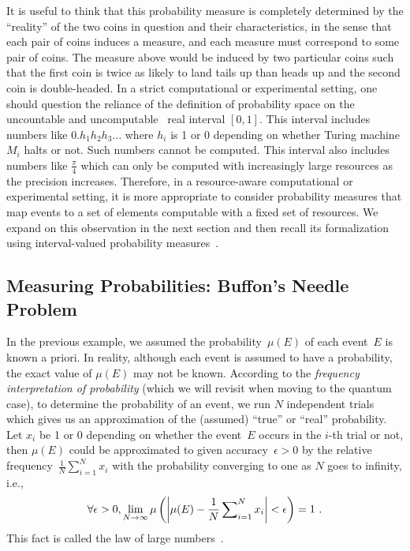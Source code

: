 \documentclass{article}
\theoremstyle{remark}
\newcommand{\pmeas}{\ensuremath{\mu}}
\begin{document}
\noindent It is useful to think that this probability measure is
completely determined by the ``reality'' of the two coins in question
and their characteristics, in the sense that each pair of coins
induces a measure, and each measure must correspond to some pair of
coins. The measure above would be induced by two particular coins such
that the first coin is twice as likely to land tails up than heads up
and the second coin is double-headed. In a strict computational
or experimental setting, one should question the reliance of the
definition of probability space on the uncountable and
uncomputable~\cite{Turing01011937,Ziegler2007,weihrauch2012computable}
real interval $[0,1]$. This interval includes numbers like
$0.h_{1}h_{2}h_{3}\ldots$ where $h_{i}$ is 1 or 0 depending on whether
Turing machine $M_{i}$ halts or not. Such numbers cannot be
computed. This interval also includes numbers like $\frac{\pi}{4}$
which can only be computed with increasingly large resources as the
precision increases. Therefore, in a resource-aware computational or
experimental setting, it is more appropriate to consider probability
measures that map events to a set of elements computable with a fixed
set of resources. We expand on this observation in the next section
and then recall its formalization using interval-valued probability
measures~\cite{Weichselberger2000,JamisonLodwick2004}.

\subsection{Measuring Probabilities: Buffon's Needle Problem\label{subsec:Measuring-Probabilities:-Buffon}}

In the previous example, we assumed the probability~$\pmeas(E)$ of
each event~$E$ is known a priori. In reality, although each event is
assumed to have a probability, the exact value of $\pmeas(E)$ may not
be known. According to the \emph{frequency interpretation of
  probability} (which we will revisit when moving to the quantum
case), to determine the probability of an event, we run $N$
independent trials which gives us an approximation of the (assumed)
``true'' or ``real'' probability. Let $x_{i}$ be 1 or 0 depending on
whether the event~$E$ occurs in the $i$-th trial or not, then
$\pmeas(E)$ could be approximated to given accuracy~$\epsilon>0$ by
the relative frequency~$\frac{1}{N}\sum_{i=1}^{N}x_{i}$ with the
probability converging to one as $N$ goes to infinity, i.e.,
\[
\forall\epsilon>0,\lim_{N\rightarrow\infty}\pmeas\left(\left|\pmeas(E)-\frac{1}{N}\sideset{}{_{i=1}^{N}}\sum x_{i}\right|<\epsilon\right)=1\textrm{ .}
\]
This fact is called the law of large numbers~\cite{Bernoulli2006,Kolmogorov1950,Uspensky1937,Shafer1976,544199}.
\end{document}
